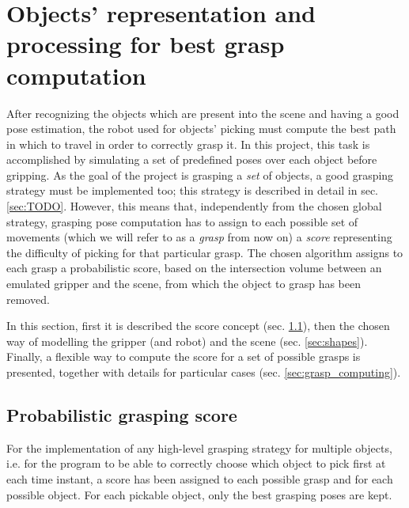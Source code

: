 \section{Objects' representation and processing for best grasp computation}
After recognizing the objects which are present into the scene and having a
good pose estimation, the robot used for objects' picking must compute the best path
in which to travel in order to correctly grasp it. In this project, this task
is accomplished by simulating a set of predefined poses over each object before
gripping. As the goal of the project is grasping a \emph{set} of objects, a
good grasping strategy must be implemented too; this strategy is described in
detail in sec. \ref{sec:TODO}. However, this means that, independently from the
chosen global strategy, grasping pose computation has to assign to each
possible set of movements (which we will refer to as a \emph{grasp} from now on)
a \emph{score} representing the difficulty of picking
for that particular grasp. The chosen algorithm assigns to each grasp a
probabilistic score, based on the intersection volume between an emulated
gripper and the scene, from which the object to grasp has been removed.

In this section, first it is described the score concept (sec.
\ref{sec:grasp_score}), then the chosen way of modelling the gripper (and robot) and
the scene (sec. \ref{sec:shapes}). Finally, a flexible way to compute the score for a set of possible
grasps is presented, together with details for particular cases (sec.
\ref{sec:grasp_computing}).

\subsection{Probabilistic grasping score} \label{sec:grasp_score}
For the implementation of any high-level grasping strategy for multiple
objects, i.e. for the program to be able to correctly choose which object to
pick first at each time instant, a score has been assigned to each possible
grasp and for each possible object. For each pickable object, only the best
grasping poses are kept.

